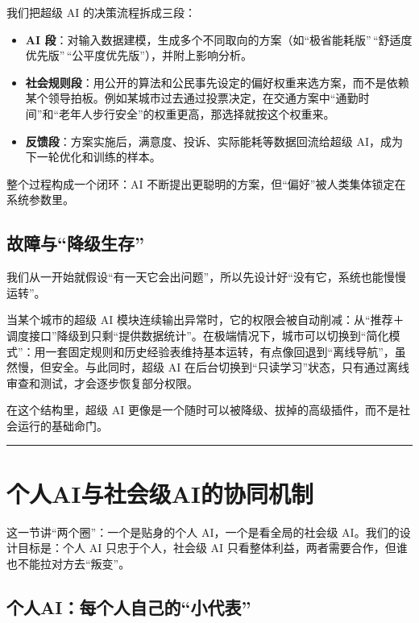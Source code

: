 我们把超级 AI 的决策流程拆成三段：

\begin{itemize}
\item
  \textbf{AI 段}：对输入数据建模，生成多个不同取向的方案（如``极省能耗版''\,``舒适度优先版''\,``公平度优先版''），并附上影响分析。
\item
  \textbf{社会规则段}：用公开的算法和公民事先设定的偏好权重来选方案，而不是依赖某个领导拍板。例如某城市过去通过投票决定，在交通方案中``通勤时间''和``老年人步行安全''的权重更高，那选择就按这个权重来。
\item
  \textbf{反馈段}：方案实施后，满意度、投诉、实际能耗等数据回流给超级 AI，成为下一轮优化和训练的样本。
\end{itemize}

整个过程构成一个闭环：AI 不断提出更聪明的方案，但``偏好''被人类集体锁定在系统参数里。

\subsection{故障与``降级生存''}\label{ux6545ux969cux4e0eux964dux7ea7ux751fux5b58}

我们从一开始就假设``有一天它会出问题''，所以先设计好``没有它，系统也能慢慢运转''。

当某个城市的超级 AI 模块连续输出异常时，它的权限会被自动削减：从``推荐＋调度接口''降级到只剩``提供数据统计''。在极端情况下，城市可以切换到``简化模式''：用一套固定规则和历史经验表维持基本运转，有点像回退到``离线导航''，虽然慢，但安全。与此同时，超级 AI 在后台切换到``只读学习''状态，只有通过离线审查和测试，才会逐步恢复部分权限。

在这个结构里，超级 AI 更像是一个随时可以被降级、拔掉的高级插件，而不是社会运行的基础命门。

\begin{center}\rule{0.5\linewidth}{0.5pt}\end{center}

\section{个人AI与社会级AI的协同机制}\label{ux4e2aux4ebaaiux4e0eux793eux4f1aux7ea7aiux7684ux534fux540cux673aux5236}

这一节讲``两个圈''：一个是贴身的个人 AI，一个是看全局的社会级 AI。我们的设计目标是：个人 AI 只忠于个人，社会级 AI 只看整体利益，两者需要合作，但谁也不能拉对方去``叛变''。

\subsection{个人AI：每个人自己的``小代表''}\label{ux4e2aux4ebaaiux6bcfux4e2aux4ebaux81eaux5df1ux7684ux5c0fux4ee3ux8868}

